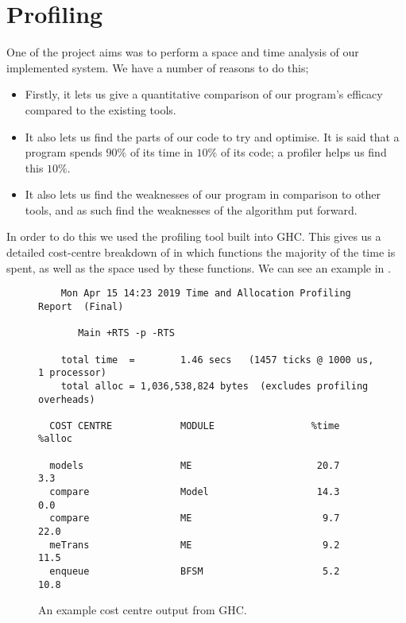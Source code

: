 \documentclass[10pt, a4paper]{report}
\begin{document}

\section{Profiling}

One of the project aims was to perform a space and time analysis of our
implemented system. We have a number of reasons to do this;

\begin{itemize}
\item Firstly, it lets us give a quantitative comparison of our program's
  efficacy compared to the existing tools.
\item It also lets us find the parts of our code to try and optimise. It is said
  that a program spends $90\%$ of its time in $10\%$ of its code; a profiler helps
  us find this $10\%$.
\item It also lets us find the weaknesses of our program in comparison to other
  tools, and as such find the weaknesses of the algorithm put forward. 
\end{itemize}

In order to do this we used the profiling tool built into GHC. This gives us a
detailed cost-centre breakdown of in which functions the majority of the time is
spent, as well as the space used by these functions. We can see an example in
.

\begin{figure}[h]
\begin{verbatim}
	Mon Apr 15 14:23 2019 Time and Allocation Profiling Report  (Final)

	   Main +RTS -p -RTS

	total time  =        1.46 secs   (1457 ticks @ 1000 us, 1 processor)
	total alloc = 1,036,538,824 bytes  (excludes profiling overheads)

  COST CENTRE            MODULE                 %time %alloc

  models                 ME                      20.7    3.3
  compare                Model                   14.3    0.0
  compare                ME                       9.7   22.0
  meTrans                ME                       9.2   11.5
  enqueue                BFSM                     5.2   10.8
\end{verbatim}
  \caption{An example cost centre output from GHC.}
  \label{fig:costcentre}
\end{figure}
\end{document}
